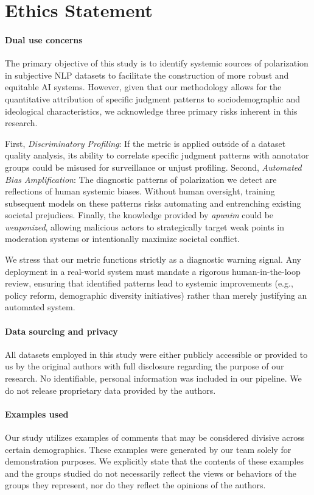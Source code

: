 \documentclass{article} %
\theoremstyle{definition}
\theoremstyle{plain}
\begin{document}
\section*{Ethics Statement}

\paragraph{Dual use concerns}The primary objective of this study is to identify systemic sources of polarization in subjective NLP datasets to facilitate the construction of more robust and equitable AI systems. However, given that our methodology allows for the quantitative attribution of specific judgment patterns to sociodemographic and ideological characteristics, we acknowledge three primary risks inherent in this research.

First, \emph{Discriminatory Profiling}: If the metric is applied outside of a dataset quality analysis, its ability to correlate specific judgment patterns with annotator groups could be misused for surveillance or unjust profiling. Second, \emph{Automated Bias Amplification}: The diagnostic patterns of polarization we detect are reflections of human systemic biases. Without human oversight, training subsequent models on these patterns risks automating and entrenching existing societal prejudices. Finally, the knowledge provided by \emph{apunim} could be \emph{weaponized}, allowing malicious actors to strategically target weak points in moderation systems or intentionally maximize societal conflict.

We stress that our metric functions strictly as a diagnostic warning signal. Any deployment in a real-world system must mandate a rigorous human-in-the-loop review, ensuring that identified patterns lead to systemic improvements (e.g., policy reform, demographic diversity initiatives) rather than merely justifying an automated system.

\paragraph{Data sourcing and privacy} All datasets employed in this study were either publicly accessible or provided to us by the original authors with full disclosure regarding the purpose of our research. No identifiable, personal information was included in our pipeline. We do not release proprietary data provided by the authors.

\paragraph{Examples used} Our study utilizes examples of comments that may be considered divisive across certain demographics. These examples were generated by our team solely for demonstration purposes. We explicitly state that the contents of these examples and the groups studied do not necessarily reflect the views or behaviors of the groups they represent, nor do they reflect the opinions of the authors.
\end{document}
